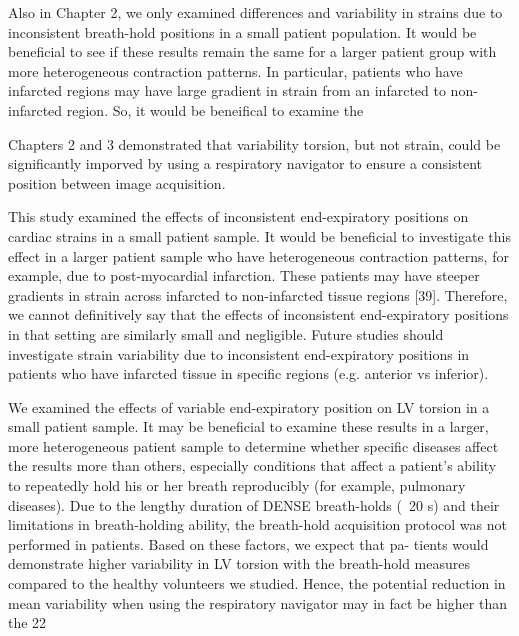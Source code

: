 	Also in Chapter 2, we only examined differences and variability in strains due to inconsistent breath-hold positions in a small patient population. It would be beneficial to see if these results remain the same for a larger patient group with more heterogeneous contraction patterns. In particular, patients who have infarcted regions may have large gradient in strain from an infarcted to non-infarcted region. So, it would be beneifical to examine the
	
	 
	Chapters 2 and 3 demonstrated that variability torsion, but not strain, could be significantly imporved by using a respiratory navigator to ensure a consistent position between image acquisition.
	
	This study examined the effects of inconsistent end-expiratory positions on cardiac strains in a small patient sample. It would be beneficial to investigate this effect in a larger patient sample who have heterogeneous contraction patterns, for example, due to post-myocardial infarction. These patients may have steeper gradients in strain across infarcted to non-infarcted tissue regions [39]. Therefore, we cannot definitively say that the effects of inconsistent end-expiratory positions in that setting are similarly small and negligible. Future studies should investigate strain variability due to inconsistent end-expiratory positions in patients who have infarcted tissue in specific regions (e.g. anterior vs inferior).
	
	We examined the effects of variable end-expiratory position on LV torsion in a small patient sample. It may be beneficial to examine these results in a larger, more heterogeneous patient sample to determine whether specific diseases affect the results more than others, especially conditions that affect a patient’s ability to repeatedly hold his or her breath reproducibly (for example, pulmonary diseases). Due to the lengthy duration of DENSE breath-holds
	(~20 s) and their limitations in breath-holding ability, the breath-hold acquisition protocol was not performed in patients. Based on these factors, we expect that pa- tients would demonstrate higher variability in LV torsion with the breath-hold measures compared to the healthy volunteers we studied. Hence, the potential reduction in mean variability when using the respiratory navigator may in fact be higher than the 22%
	
